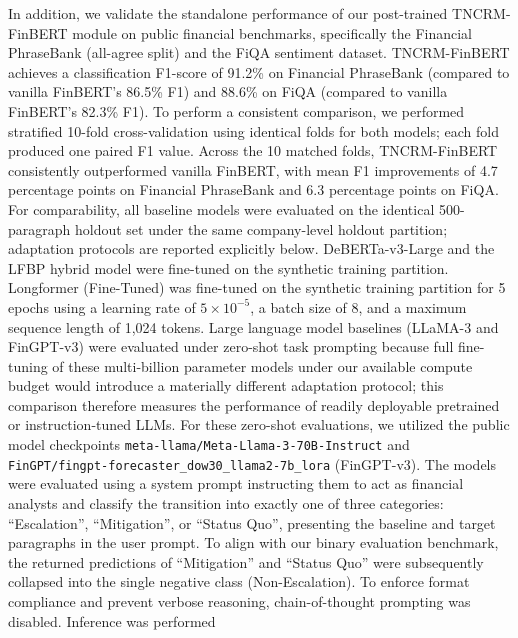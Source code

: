 \documentclass[journal]{IEEEtran}
\begin{document}
\begin{table}[h]
\centering
\caption{Binary Confusion Matrix on 500-Pair Human Holdout Set}
\label{tab:confusion_matrix}
\end{table}

In addition, we validate the standalone performance of our post-trained TNCRM-FinBERT module on public financial benchmarks, specifically the Financial PhraseBank (all-agree split) and the FiQA sentiment dataset. TNCRM-FinBERT achieves a classification F1-score of 91.2\% on Financial PhraseBank (compared to vanilla FinBERT's 86.5\% F1) and 88.6\% on FiQA (compared to vanilla FinBERT's 82.3\% F1). To perform a consistent comparison, we performed stratified 10-fold cross-validation using identical folds for both models; each fold produced one paired F1 value. Across the 10 matched folds, TNCRM-FinBERT consistently outperformed vanilla FinBERT, with mean F1 improvements of 4.7 percentage points on Financial PhraseBank and 6.3 percentage points on FiQA. For comparability, all baseline models were evaluated on the identical 500-paragraph holdout set under the same company-level holdout partition; adaptation protocols are reported explicitly below. DeBERTa-v3-Large \cite{deberta} and the LFBP hybrid model were fine-tuned on the synthetic training partition. Longformer (Fine-Tuned) \cite{beltagy2020longformer} was fine-tuned on the synthetic training partition for 5 epochs using a learning rate of $5\times10^{-5}$, a batch size of 8, and a maximum sequence length of 1,024 tokens. Large language model baselines (LLaMA-3 \cite{llama3} and FinGPT-v3) were evaluated under zero-shot task prompting because full fine-tuning of these multi-billion parameter models under our available compute budget would introduce a materially different adaptation protocol; this comparison therefore measures the performance of readily deployable pretrained or instruction-tuned LLMs. For these zero-shot evaluations, we utilized the public model checkpoints \texttt{meta-llama/}\allowbreak\texttt{Meta-Llama-3-70B-Instruct} and \texttt{FinGPT/}\allowbreak\texttt{fingpt-forecaster\_dow30\_llama2-7b\_lora} (FinGPT-v3). The models were evaluated using a system prompt instructing them to act as financial analysts and classify the transition into exactly one of three categories: ``Escalation'', ``Mitigation'', or ``Status Quo'', presenting the baseline and target paragraphs in the user prompt. To align with our binary evaluation benchmark, the returned predictions of ``Mitigation'' and ``Status Quo'' were subsequently collapsed into the single negative class (Non-Escalation). To enforce format compliance and prevent verbose reasoning, chain-of-thought prompting was disabled. Inference was performed 
\end{document}
